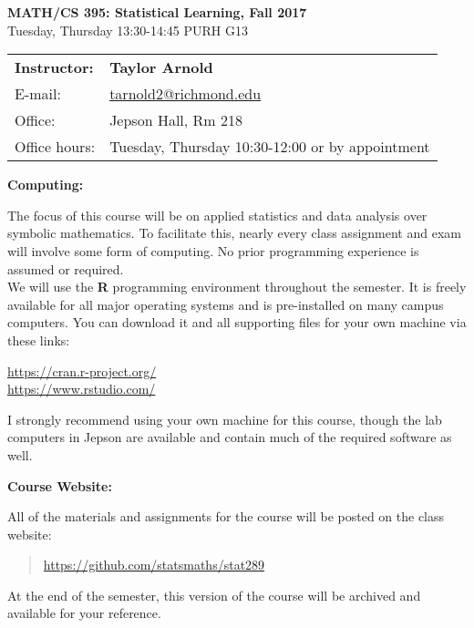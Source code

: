 \documentclass[12pt]{article}
\begin{document}
\begin{center}
{\bf MATH/CS 395: Statistical Learning, Fall 2017} \\
Tuesday, Thursday 13:30-14:45 \quad PURH G13\\
\end{center}

\bigskip

\noindent
\begin{tabular}{ l l }
{\bf Instructor:} &  {\bf Taylor Arnold} \\
E-mail: & \href{mailto:tarnold2@richmond.edu}{tarnold2@richmond.edu} \\
Office: & Jepson Hall, Rm 218 \\
Office hours: & Tuesday, Thursday 10:30-12:00 or by appointment
\end{tabular}

\vspace{0.5cm}

\textbf{Computing:} \vspace{6pt}

The focus of this course will be on applied statistics and data analysis
over symbolic mathematics. To facilitate this, nearly every class
assignment and exam will involve some form of computing.
No prior programming experience is assumed or required. \\

We will use the \textbf{R} programming environment throughout the
semester. It is freely available for all major operating systems and
is pre-installed on many campus computers. You can download it and
all supporting files for your own machine via these links:
\begin{center}
\url{https://cran.r-project.org/} \\
\url{https://www.rstudio.com/}
\end{center}
I strongly recommend using your own machine for this course, though
the lab computers in Jepson are available and contain much of the
required software as well.

\vspace{0.4cm}

\textbf{Course Website:} \vspace{6pt}

All of the materials and assignments for the course will be posted
on the class website:
\begin{quote}
\url{https://github.com/statsmaths/stat289}
\end{quote}
At the end of the semester, this version of the course
will be archived and available for your reference.
\end{document}
